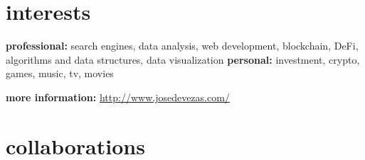 \documentclass{friggeri-cv}
\begin{document}

\section{interests}

\textbf{professional:} search engines, data analysis, web development, blockchain, DeFi, algorithms and data structures, data visualization \textbf{personal:} investment, crypto, games, music, tv, movies

\textbf{more information:} \url{http://www.josedevezas.com/}


\section{collaborations}
\end{document}
